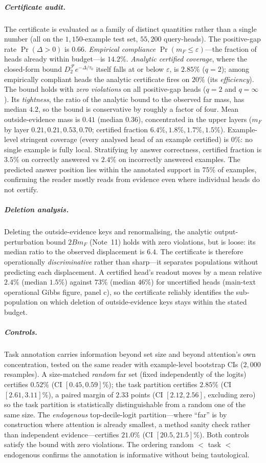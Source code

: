 \documentclass[10pt,twocolumn]{article}
\begin{document}
\subparagraph{Certificate audit.} The certificate is evaluated as a family of distinct quantities rather than a single number (all on the $1{,}150$-example test set, $55{,}200$ query-heads). The positive-gap rate $\Pr(\Delta>0)$ is $0.66$. \emph{Empirical compliance} $\Pr(m_F\le\varepsilon)$---the fraction of heads already within budget---is $14.2\%$. \emph{Analytic certified coverage}, where the closed-form bound $D_2^{\mathcal{F}}e^{-\Delta/\tau_0}$ itself falls at or below $\varepsilon$, is $2.85\%$ ($q{=}2$); among empirically compliant heads the analytic certificate fires on $20\%$ (its \emph{efficiency}). The bound holds with \emph{zero violations} on all positive-gap heads ($q{=}2$ and $q{=}\infty$). Its \emph{tightness}, the ratio of the analytic bound to the observed far mass, has median $4.2$, so the bound is conservative by roughly a factor of four. Mean outside-evidence mass is $0.41$ (median $0.36$), concentrated in the upper layers ($m_F$ by layer $0.21,0.21,0.53,0.70$; certified fraction $6.4\%,1.8\%,1.7\%,1.5\%$). Example-level stringent coverage (every analysed head of an example certified) is $0\%$: no single example is fully local. Stratifying by answer correctness, certified fraction is $3.5\%$ on correctly answered vs $2.4\%$ on incorrectly answered examples. The predicted answer position lies within the annotated support in $75\%$ of examples, confirming the reader mostly reads from evidence even where individual heads do not certify.

\subparagraph{Deletion analysis.} Deleting the outside-evidence keys and renormalising, the analytic output-perturbation bound $2Bm_F$ (Note~11) holds with zero violations, but is loose: its median ratio to the observed displacement is $6.4$. The certificate is therefore operationally \emph{discriminative} rather than sharp---it separates populations without predicting each displacement. A certified head's readout moves by a mean relative $2.4\%$ (median $1.5\%$) against $73\%$ (median $46\%$) for uncertified heads (main-text operational Gibbs figure, panel c), so the certificate reliably identifies the sub-population on which deletion of outside-evidence keys stays within the stated budget.

\subparagraph{Controls.} Task annotation carries information beyond set size and beyond attention's own concentration, tested on the same reader with example-level bootstrap CIs ($2{,}000$ resamples). A size-matched \emph{random} far set (fixed independently of the logits) certifies $0.52\%$ (CI $[0.45,0.59]\%$); the task partition certifies $2.85\%$ (CI $[2.61,3.11]\%$), a paired margin of $2.33$ points (CI $[2.12,2.56]$, excluding zero) so the task partition is statistically distinguishable from a random one of the same size. The \emph{endogenous} top-decile-logit partition---where ``far'' is by construction where attention is already smallest, a method sanity check rather than independent evidence---certifies $21.0\%$ (CI $[20.5,21.5]\%$). Both controls satisfy the bound with zero violations. The ordering random $<$ task $<$ endogenous confirms the annotation is informative without being tautological.
\end{document}
